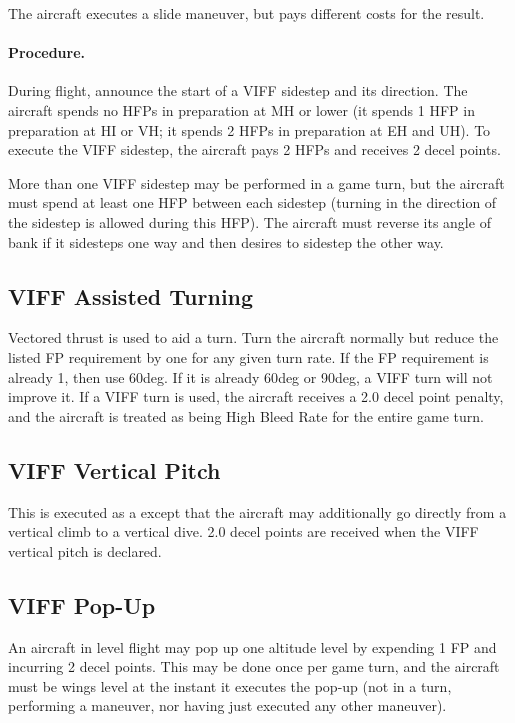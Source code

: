 \begin{advancedrules}
The aircraft executes a slide maneuver, but pays different costs for the result.

\paragraph{Procedure.} During flight, announce the start of a VIFF sidestep and its direction. The aircraft spends no HFPs in preparation at MH or lower (it spends 1 HFP in preparation at HI or VH; it spends 2 HFPs in preparation at EH and UH). To execute the VIFF sidestep, the aircraft pays 2 HFPs and receives 2 decel points.

More than one VIFF sidestep may be performed in a game turn, but the aircraft must spend at least one HFP between each sidestep (turning in the direction of the sidestep is allowed during this HFP). The aircraft must reverse its angle of bank if it sidesteps one way and then desires to sidestep the other way.

\subsection{VIFF Assisted Turning}

Vectored thrust is used to aid a turn. Turn the aircraft normally but reduce the listed FP requirement by one for any given turn rate. If the FP requirement is already 1, then use 60{deg}. If it is already 60{deg} or 90{deg}, a VIFF turn will not improve it. If a VIFF turn is used, the aircraft receives a 2.0 decel point penalty, and the aircraft is treated as being High Bleed Rate for the entire game turn.

\subsection{VIFF Vertical Pitch}

This is executed as a  except that the aircraft may additionally go directly from a vertical climb to a vertical dive. 2.0 decel points are received when the VIFF vertical pitch is declared. 

\subsection{VIFF Pop-Up}

An aircraft in level flight may pop up one altitude level by expending 1 FP and incurring 2 decel points. This may be done once per game turn, and the aircraft must be wings level at the instant it executes the pop-up (not in a turn, performing a maneuver, nor having just executed any other maneuver).


\end{advancedrules}
